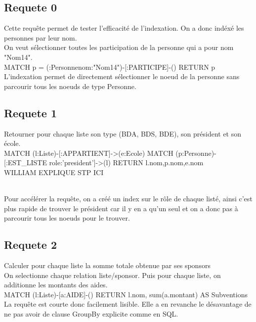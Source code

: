 \documentclass[a4paper,oneside,1pt]{article}
\begin{document}
\subsection{Requete 0}
Cette requête permet de tester l'efficacité de l'indexation. On a donc indéxé les personnes par leur nom.
\\
On veut sélectionner toutes les participation de la personne qui a pour nom "Nom14". 
\\
MATCH p = (:Personne{nom:"Nom14"})-[:PARTICIPE]-() RETURN p
\\L'indexation permet de directement sélectionner le noeud de la personne sans parcourir tous les noeuds de type Personne.

\subsection{Requete 1}
Retourner pour chaque liste son type (BDA, BDS, BDE), son président et son école.
\\
MATCH (l:Liste)-[:APPARTIENT]->(e:Ecole)
MATCH (p:Personne)-[:EST_LISTE {role:'president'}]->(l)
RETURN l.nom,p.nom,e.nom
\\WILLIAM EXPLIQUE STP ICI

\\Pour accélérer la requête, on a créé un index sur le rôle de chaque listé, ainsi c'est plus rapide de trouver le président car il y en a qu'un seul et on a donc pas à parcourir tous les noeuds pour le trouver.


\subsection{Requete 2}
Calculer pour chaque liste la somme totale obtenue par ses sponsors
\\
On selectionne chaque relation liste/sponsor. Puis pour chaque liste, on additionne les montants des aides.
\\
MATCH (l:Liste)-[a:AIDE]-() 
RETURN l.nom, sum(a.montant) AS Subventions
\\
La requête est courte donc facilement lisible. Elle a en revanche le désavantage de ne pas avoir de clause GroupBy explicite comme en SQL.
\end{document}
